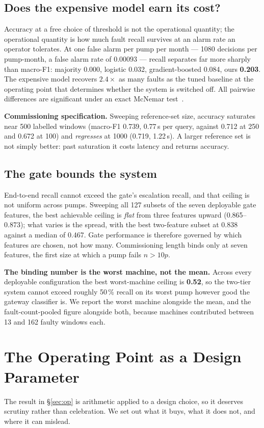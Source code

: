 \documentclass[conference,a4paper,10pt]{IEEEtran}
\begin{document}
\subsection{Does the expensive model earn its cost?}
Accuracy at a free choice of threshold is not the operational quantity; the
operational quantity is how much fault recall survives at an alarm rate an
operator tolerates. At one false alarm per pump per month --- 1080 decisions per
pump-month, a false alarm rate of $0.00093$ --- recall separates far more sharply
than macro-F1: majority 0.000, logistic 0.032, gradient-boosted 0.084, ours
\textbf{0.203}. The expensive model recovers $2.4\times$ as many faults as the
tuned baseline at the operating point that determines whether the system is
switched off. All pairwise differences are significant under an exact McNemar
test~\cite{dietterich1998}.

\textbf{Commissioning specification.} Sweeping reference-set size, accuracy
saturates near 500 labelled windows (macro-F1 0.739, 0.77\,s per query, against
0.712 at 250 and 0.672 at 100) and \emph{regresses} at 1000 (0.719, 1.22\,s). A
larger reference set is not simply better: past saturation it costs latency and
returns accuracy.

\subsection{The gate bounds the system}
End-to-end recall cannot exceed the gate's escalation recall, and that ceiling is
not uniform across pumps. Sweeping all 127 subsets of the seven deployable gate
features, the best achievable ceiling is \emph{flat} from three features upward
(0.865--0.873); what varies is the spread, with the best two-feature subset at
0.838 against a median of 0.467. Gate performance is therefore governed by which
features are chosen, not how many. Commissioning length binds only at seven
features, the first size at which a pump fails $n>10p$.

\textbf{The binding number is the worst machine, not the mean.} Across every
deployable configuration the best worst-machine ceiling is \textbf{0.52}, so the
two-tier system cannot exceed roughly 50\,\% recall on its worst pump however good
the gateway classifier is. We report the worst machine alongside the mean, and
the fault-count-pooled figure alongside both, because machines contributed
between 13 and 162 faulty windows each.

\section{The Operating Point as a Design Parameter}
\label{sec:opmethod}
The result in \S\ref{sec:op} is arithmetic applied to a design choice, so it
deserves scrutiny rather than celebration. We set out what it buys, what it does
not, and where it can mislead.
\end{document}
